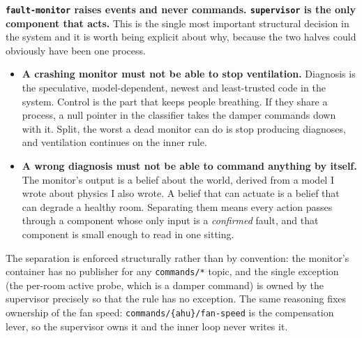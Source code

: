 \textbf{\texttt{fault-monitor} raises events and never commands. \texttt{supervisor} is the only
component that acts.} This is the single most important structural decision in the system and it
is worth being explicit about why, because the two halves could obviously have been one process.

\begin{itemize}
\tightlist
\item \textbf{A crashing monitor must not be able to stop ventilation.} Diagnosis is the
  speculative, model-dependent, newest and least-trusted code in the system. Control is the part
  that keeps people breathing. If they share a process, a null pointer in the classifier takes the
  damper commands down with it. Split, the worst a dead monitor can do is stop producing
  diagnoses, and ventilation continues on the inner rule.
\item \textbf{A wrong diagnosis must not be able to command anything by itself.} The monitor's
  output is a belief about the world, derived from a model I wrote about physics I also wrote. A
  belief that can actuate is a belief that can degrade a healthy room. Separating them means every
  action passes through a component whose only input is a \emph{confirmed} fault, and that
  component is small enough to read in one sitting.
\end{itemize}

The separation is enforced structurally rather than by convention: the monitor's container has no
publisher for any \texttt{commands/*} topic, and the single exception (the per-room active probe,
which is a damper command) is owned by the supervisor precisely so that the rule has no
exception. The same reasoning fixes ownership of the fan speed: \texttt{commands/\{ahu\}/fan-speed}
is the compensation lever, so the supervisor owns it and the inner loop never writes it.

